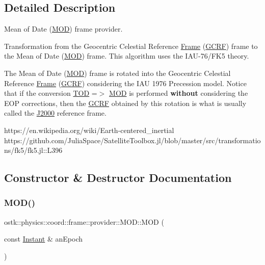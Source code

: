 \subsection{Detailed Description}
Mean of Date (\hyperlink{classostk_1_1physics_1_1coord_1_1frame_1_1provider_1_1_m_o_d}{M\+OD}) frame provider. 

Transformation from the Geocentric Celestial Reference \hyperlink{classostk_1_1physics_1_1coord_1_1_frame}{Frame} (\hyperlink{classostk_1_1physics_1_1coord_1_1frame_1_1provider_1_1_g_c_r_f}{G\+C\+RF}) frame to the Mean of Date (\hyperlink{classostk_1_1physics_1_1coord_1_1frame_1_1provider_1_1_m_o_d}{M\+OD}) frame. This algorithm uses the I\+A\+U-\/76/\+F\+K5 theory.

The Mean of Date (\hyperlink{classostk_1_1physics_1_1coord_1_1frame_1_1provider_1_1_m_o_d}{M\+OD}) frame is rotated into the Geocentric Celestial Reference \hyperlink{classostk_1_1physics_1_1coord_1_1_frame}{Frame} (\hyperlink{classostk_1_1physics_1_1coord_1_1frame_1_1provider_1_1_g_c_r_f}{G\+C\+RF}) considering the I\+AU 1976 Precession model. Notice that if the conversion {\ttfamily \hyperlink{classostk_1_1physics_1_1coord_1_1frame_1_1provider_1_1_t_o_d}{T\+OD} =$>$ \hyperlink{classostk_1_1physics_1_1coord_1_1frame_1_1provider_1_1_m_o_d}{M\+OD}} is performed {\bfseries without} considering the E\+OP corrections, then the \hyperlink{classostk_1_1physics_1_1coord_1_1frame_1_1provider_1_1_g_c_r_f}{G\+C\+RF} obtained by this rotation is what is usually called the \hyperlink{classostk_1_1physics_1_1coord_1_1frame_1_1provider_1_1_j2000}{J2000} reference frame.

https\+://en.wikipedia.\+org/wiki/\+Earth-\/centered\+\_\+inertial https\+://github.com/\+Julia\+Space/\+Satellite\+Toolbox.\+jl/blob/master/src/transformations/fk5/fk5.jl\+::\+L396 

\subsection{Constructor \& Destructor Documentation}
\mbox{\label{classostk_1_1physics_1_1coord_1_1frame_1_1provider_1_1_m_o_d_acba77d3f427fdbbb5753e86acf5edbc7}} 
\subsubsection{\texorpdfstring{M\+O\+D()}{MOD()}}
{\footnotesize\ttfamily ostk\+::physics\+::coord\+::frame\+::provider\+::\+M\+O\+D\+::\+M\+OD (\begin{DoxyParamCaption}\item[{const \hyperlink{classostk_1_1physics_1_1time_1_1_instant}{Instant} \&}]{an\+Epoch }\end{DoxyParamCaption})}

